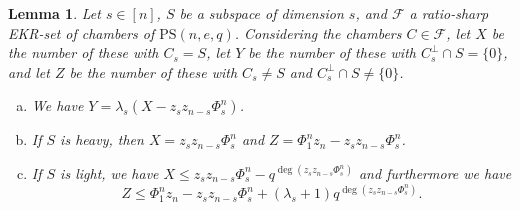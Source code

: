 \documentclass[11pt]{article}
\newtheorem{lemma}[thm]{Lemma}
\newcommand{\EKR}{\mathcal{F}}
\newcommand{\PS}{\mathrm{PS}}
\renewcommand{\le}{\leqslant}
\begin{document}
\begin{lemma} \label{L: key for the proof}
Let $s \in [n]$, $S$ be a subspace of dimension $s$, and $\EKR$ a ratio-sharp EKR-set of chambers of $\PS(n,e,q)$. Considering the chambers $C \in \EKR$, let $X$ be the number of these with $C_s=S$, let $Y$ be the number of these with $C_s^\perp \cap S=\{0\}$, and let $Z$ be the number of these with $C_s\neq S$ and $C_s^\perp \cap S\neq \{0\}$.
\begin{enumerate}[(a)]
\item We have $Y=\lambda_s (X-z_sz_{n-s} \Phi_s^n)$.
\item If $S$ is heavy, then $X=z_sz_{n-s}\Phi_s^n$ and $Z=\Phi_1^n z_n- z_sz_{n-s}\Phi_s^n$.
\item If $S$ is light, we have $X\le z_sz_{n-s}\Phi_s^n-q^{\deg(z_sz_{n-s}\Phi_s^n)}$ and furthermore we have $$Z\le \Phi_1^nz_n -z_sz_{n-s}\Phi_s^n+ (\lambda_s+1) q^{\deg(z_sz_{n-s} \Phi_s^n)}. $$
\end{enumerate}
\end{lemma}
\end{document}
